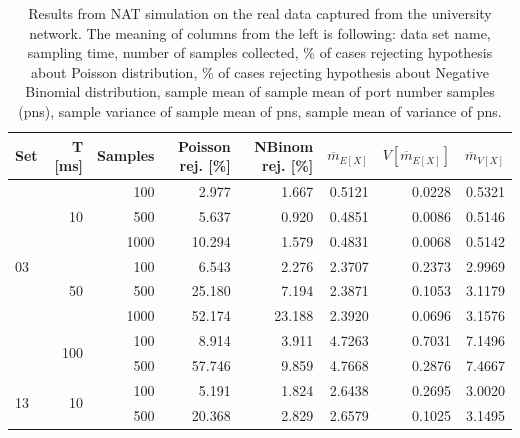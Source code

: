 \documentclass{acm_proc_article-sp}
\begin{document}
\begin{table}[t]
  \centering
  \begin{tabular}{| l | r | r | r | r | r | r | r |} %
    \hline
    Set & T [ms] & Samples & Poisson rej. [\%] & NBinom rej. [\%] & $\overline{m}_{E[X]}$ &  $V[\overline{m}_{E[X]}]$  & $\overline{m}_{V[X]}$ \\ \hline \hline 
    \multirow{7}{*}{03} & \multirow{3}{*}{10}   & 100		& 2.977		& 1.667		& 0.5121        & 0.0228                    & 0.5321 \\ \cline{3-8}
      &      & 500      	& 5.637		& 0.920		& 0.4851        & 0.0086        & 0.5146 \\  \cline{3-8}
      &      & 1000     	& 10.294	& 1.579		& 0.4831        & 0.0068        & 0.5142 \\  \cline{2-8}
      & \multirow{3}{*}{50}     & 100     	& 6.543		& 2.276 	& 2.3707	& 0.2373 & 2.9969 \\ \cline{3-8}
      &      & 500     		& 25.180	& 7.194		& 2.3871        & 0.1053        & 3.1179 \\ \cline{3-8}
      &      & 1000    		& 52.174	& 23.188	& 2.3920        & 0.0696        & 3.1576 \\ \cline{2-8}
      & \multirow{2}{*}{100}  	& 100		& 8.914		& 3.911		& 4.7263        & 0.7031                    & 7.1496 \\ \cline{3-8}
      &      & 500     		& 57.746	& 9.859		& 4.7668	& 0.2876 	& 7.4667 					\\ \hline
    \multirow{2}{*}{13}  & \multirow{2}{*}{10}     & 100     & 5.191      & 1.824     & 2.6438       &  0.2695    & 3.0020 \\ \cline{3-8}
      &      & 500     & 20.368     & 2.829     & 2.6579       &  0.1025                    & 3.1495 \\ \hline
  \end{tabular}
  \caption{Results from NAT simulation on the real data captured from the university network. 
    The meaning of columns from the left is following: data set name, sampling time, number of samples collected,
    \% of cases rejecting hypothesis about Poisson distribution,  
    \% of cases rejecting hypothesis about Negative Binomial distribution,
    sample mean of sample mean of port number samples (pns),
    sample variance of sample mean of pns,
    sample mean of variance of pns.}
  \label{tab:1}
\end{table}
\end{document}
